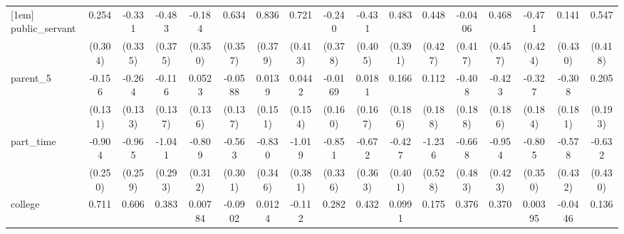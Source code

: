 {\begin{tabular}{l*{16}{c}}
[1em]
public\_servant      &       0.254         &      -0.331         &      -0.483         &      -0.184         &       0.634         &       0.836\sym{*}  &       0.721         &      -0.240         &      -0.431         &       0.483         &       0.448         &     -0.0406         &       0.468         &      -0.471         &       0.141         &       0.547         \\
                    &     (0.304)         &     (0.335)         &     (0.375)         &     (0.350)         &     (0.357)         &     (0.379)         &     (0.413)         &     (0.378)         &     (0.405)         &     (0.391)         &     (0.427)         &     (0.417)         &     (0.457)         &     (0.424)         &     (0.430)         &     (0.418)         \\
[1em]
parent\_5            &      -0.156         &      -0.264\sym{*}  &      -0.116         &      0.0523         &     -0.0588         &      0.0139         &      0.0442         &     -0.0169         &      0.0181         &       0.166         &       0.112         &      -0.408\sym{*}  &      -0.423\sym{*}  &      -0.327         &      -0.308         &       0.205         \\
                    &     (0.131)         &     (0.133)         &     (0.137)         &     (0.136)         &     (0.137)         &     (0.151)         &     (0.154)         &     (0.160)         &     (0.167)         &     (0.186)         &     (0.188)         &     (0.188)         &     (0.186)         &     (0.184)         &     (0.181)         &     (0.193)         \\
[1em]
part\_time           &      -0.904\sym{***}&      -0.965\sym{***}&      -1.041\sym{***}&      -0.809\sym{**} &      -0.563         &      -0.830\sym{*}  &      -1.019\sym{**} &      -0.851\sym{*}  &      -0.672         &      -0.427         &      -1.236\sym{*}  &      -0.668         &      -0.954\sym{*}  &      -0.805\sym{*}  &      -0.578         &      -0.632         \\
                    &     (0.250)         &     (0.259)         &     (0.293)         &     (0.312)         &     (0.301)         &     (0.346)         &     (0.381)         &     (0.336)         &     (0.363)         &     (0.401)         &     (0.528)         &     (0.483)         &     (0.423)         &     (0.350)         &     (0.432)         &     (0.430)         \\
[1em]
college             &       0.711\sym{***}&       0.606\sym{**} &       0.383         &     0.00784         &     -0.0902         &      0.0124         &      -0.112         &       0.282         &       0.432         &      0.0991         &       0.175         &       0.376         &       0.370         &     0.00395         &     -0.0446         &       0.136         \\

\end{tabular}}
